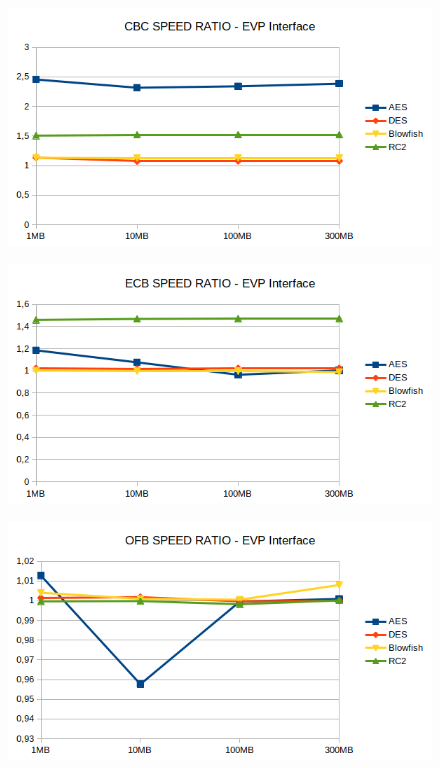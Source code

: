 \documentclass[11pt]{article}
\begin{document}
\begin{figure}[!ht]
  \includegraphics[width=1\textwidth]{pic3-hw1-1635747}
  \label{fig:CBC result- EVP interface}
\end{figure}
\begin{figure}
  \includegraphics[width=1\textwidth]{pic4-hw1-1635747}
  \label{fig:ECB result- EVP interface}
\end{figure}
\begin{figure}
  \includegraphics[width=1\textwidth]{pic5-hw1-1635747}
  \label{fig:OFB result- EVP interface}
\end{figure}
\end{document}
